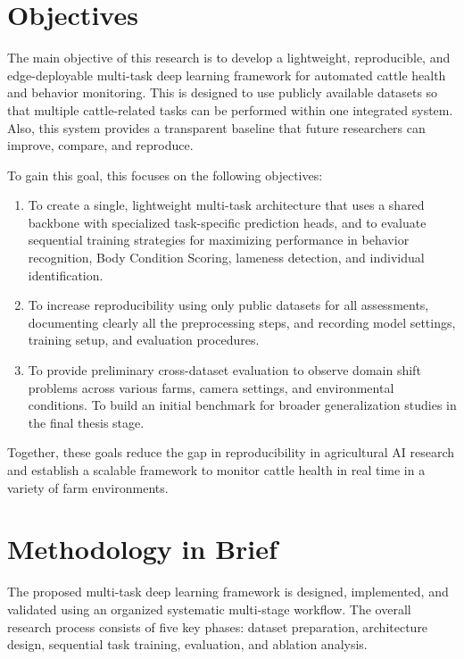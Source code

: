 \section{Objectives}

The main objective of this research is to develop a lightweight, reproducible, and edge-deployable multi-task deep learning framework for automated cattle health and behavior monitoring. This is designed to use publicly available datasets so that multiple cattle-related tasks can be performed within one integrated system. Also, this system provides a transparent baseline that future researchers can improve, compare, and reproduce.

To gain this goal, this focuses on the following objectives:

\begin{enumerate}
    \item To create a single, lightweight multi-task architecture that uses a shared backbone with specialized task-specific prediction heads, and to evaluate sequential training strategies for maximizing performance in behavior recognition, Body Condition Scoring, lameness detection, and individual identification.
    
    \item To increase reproducibility using only public datasets for all assessments, documenting clearly all the preprocessing steps, and recording model settings, training setup, and evaluation procedures.
    
    \item To provide preliminary cross-dataset evaluation to observe domain shift problems across various farms, camera settings, and environmental conditions. To build an initial benchmark for broader generalization studies in the final thesis stage.
\end{enumerate}

Together, these goals reduce the gap in reproducibility in agricultural AI research and establish a scalable framework to monitor cattle health in real time in a variety of farm environments.


\section{Methodology in Brief}

The proposed multi-task deep learning framework is designed, implemented, and validated using an organized systematic multi-stage workflow. The overall research process consists of five key phases: dataset preparation, architecture design, sequential task training, evaluation, and ablation analysis.


